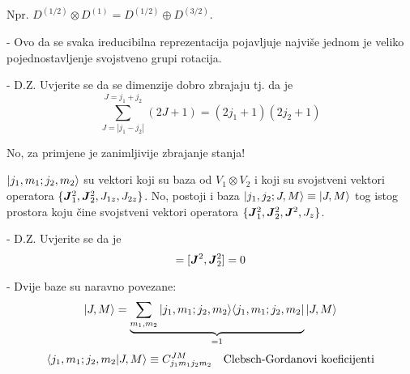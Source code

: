 Npr. $D^{(1/2)}\otimes D^{(1)} = D^{(1/2)} \oplus D^{(3/2)}$.

- Ovo da se svaka ireducibilna reprezentacija pojavljuje najviše jednom
je veliko pojednostavljenje svojstveno grupi rotacija.

- D.Z. Uvjerite se da se dimenzije dobro zbrajaju tj. da je 
\begin{displaymath}
    \sum_{J=|j_1-j_2|}^{J=j_1+j_2} (2J+1) = (2j_1+1)(2j_2+1)
\end{displaymath}

No, za primjene je zanimljivije zbrajanje stanja!

$| j_1, m_1; j_2, m_2 \rangle$ su vektori koji su baza od $V_1 \otimes V_2$ i
koji su svojstveni vektori operatora $\{\jsqj, \jsqd, J_{1z}, J_{2z}\}$. No,
postoji i baza $| j_1, j_2; J, M \rangle\equiv| J, M \rangle$
tog istog prostora koju čine svojstveni vektori operatora
$\{\jsqj, \jsqd, \jsq, J_z\}$.

- D.Z. Uvjerite se da je
\begin{displaymath}
   [\jsq, \jsqj] = [\jsq, \jsqd] = 0
\end{displaymath}

- Dvije baze su naravno povezane:
\begin{equation*}
| J, M \rangle = \underbrace{\sum_{m_1,m_2}| j_1, m_1; j_2, m_2 \rangle
\langle j_1, m_1; j_2, m_2 |}_{=1}
| J, M \rangle
\end{equation*}
\begin{equation}
 \langle j_1, m_1; j_2, m_2 | J, M\rangle \equiv C^{JM}_{j_1m_1j_2m_2}
\quad \text{Clebsch-Gordanovi koeficijenti}
\end{equation}

